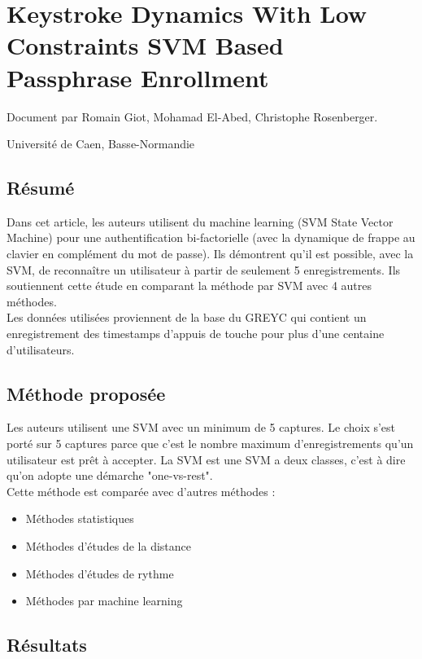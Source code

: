 \section{Keystroke Dynamics With Low Constraints SVM Based Passphrase Enrollment}

Document par Romain Giot, Mohamad El-Abed, Christophe Rosenberger.

Université de Caen, Basse-Normandie

\subsection{Résumé}

Dans cet article, les auteurs utilisent du machine learning (SVM State Vector Machine) pour une authentification bi-factorielle (avec la dynamique de frappe au clavier en complément du mot de passe). Ils démontrent qu'il est possible, avec la SVM, de reconnaître un utilisateur à partir de seulement 5 enregistrements. Ils soutiennent cette étude en comparant la méthode par SVM avec 4 autres méthodes.\\

Les données utilisées proviennent de la base du GREYC qui contient un enregistrement des timestamps d'appuis de touche pour plus d'une centaine d'utilisateurs.

\subsection{Méthode proposée}

Les auteurs utilisent une SVM avec un minimum de 5 captures. Le choix s'est porté sur 5 captures parce que c'est le nombre maximum d'enregistrements qu'un utilisateur est prêt à accepter. La SVM est une SVM a deux classes, c'est à dire qu'on adopte une démarche "one-vs-rest".\\

Cette méthode est comparée avec d'autres méthodes :

\begin{itemize}
  \item Méthodes statistiques
  \item Méthodes d'études de la distance
  \item Méthodes d'études de rythme
  \item Méthodes par machine learning
\end{itemize}

\subsection{Résultats}

